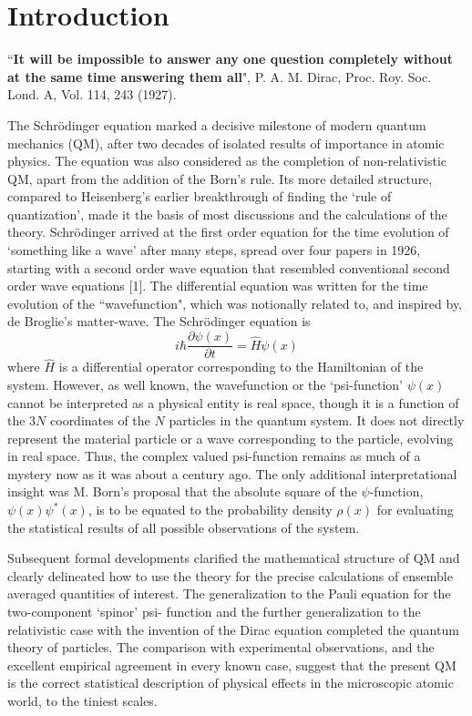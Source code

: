 \section{Introduction}

``\textbf{It will be impossible to answer any one question completely without at the
same time answering them all}", P. A. M. Dirac, Proc. Roy. Soc. Lond. A, Vol. 114,
243 (1927).

The Schr\"{o}dinger equation marked a decisive milestone of modern quantum mechanics
(QM), after two decades of isolated results of importance in atomic physics. The equation
was also considered as the completion of non-relativistic QM, apart from the addition of the
Born's rule. Its more detailed structure, compared to Heisenberg's earlier breakthrough of
finding the `rule of quantization', made it the basis of most discussions and the calculations
of the theory. Schr\"{o}dinger arrived at the first order equation for the time evolution of
`something like a wave' after many steps, spread over four papers in 1926, starting with a
second order wave equation that resembled conventional second order wave equations [1].
The differential equation was written for the time evolution of the ``wavefunction", which was
notionally related to, and inspired by, de Broglie's matter-wave. The Schr\"{o}dinger equation
is
\begin{equation*}
i \hbar \frac{\partial \psi (x)}{\partial t} = \hat{H} \psi (x) \tag{1}
\end{equation*}
where $\hat{H}$ is a differential operator corresponding to the Hamiltonian of the system. However,
as well known, the wavefunction or the `psi-function' $\psi (x)$ cannot be interpreted as a physical
entity is real space, though it is a function of the $3N$ coordinates of the $N$ particles in the
quantum system. It does not directly represent the material particle or a wave corresponding
to the particle, evolving in real space. Thus, the complex valued psi-function remains as
much of a mystery now as it was about a century ago. The only additional interpretational
insight was M. Born's proposal that the absolute square of the $\psi$-function, $\psi(x) \psi^{\ast}(x)$, is to
be equated to the probability density $\rho(x)$ for evaluating the statistical results of all possible
observations of the system.

Subsequent formal developments clarified the mathematical structure of QM and clearly
delineated how to use the theory for the precise calculations of ensemble averaged quantities
of interest. The generalization to the Pauli equation for the two-component `spinor' psi-
function and the further generalization to the relativistic case with the invention of the Dirac
equation completed the quantum theory of particles. The comparison with experimental
observations, and the excellent empirical agreement in every known case, suggest that the
present QM is the correct statistical description of physical effects in the microscopic atomic
world, to the tiniest scales.

